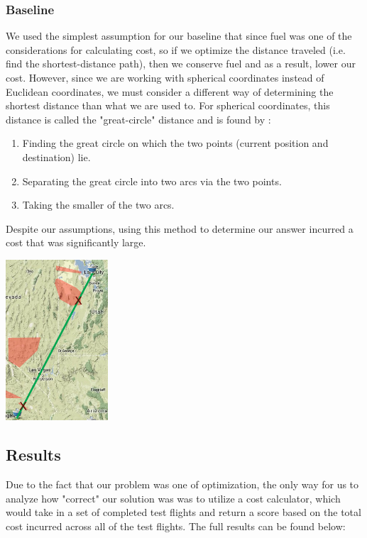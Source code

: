 \documentclass{article}[12pt]
\begin{document}
\begin{multicols}{2}
\subsubsection{Baseline}

We used the simplest assumption for our baseline that since fuel was one of the considerations for calculating cost, so if we optimize the distance traveled (i.e. find the shortest-distance path), then we conserve fuel and as a result, lower our cost. However, since we are working with spherical coordinates instead of Euclidean coordinates, we must consider a different way of determining the shortest distance than what we are used to. For spherical coordinates, this distance is called the "great-circle" distance and is found by \cite{wiki}:\\

	\begin{enumerate}
		\item Finding the great circle on which the two points (current position and destination) lie.
		\item Separating the great circle into two arcs via the two points. 
		\item Taking the smaller of the two arcs.\\
	\end{enumerate}

Despite our assumptions, using this method to determine our answer incurred a cost that was significantly large.

\begingroup
  \begin{center}
    \includegraphics[width=1.5in]{baseline.png}
	\end{center}
\endgroup

\subsection{Results}
Due to the fact that our problem was one of optimization, the only way for us to analyze how "correct" our solution was was to utilize a cost calculator, which would take in a set of completed test flights and return a score based on the total cost incurred across all of the test flights. The full results can be found below:\\


\end{multicols}
\end{document}
